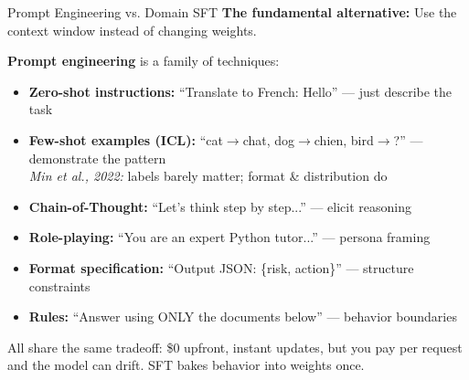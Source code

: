 \documentclass[aspectratio=169]{beamer}
\begin{document}
\begin{frame}{Prompt Engineering vs. Domain SFT}
  \small
  \textbf{The fundamental alternative:} Use the context window instead of changing weights.

  \vspace{4pt}
  \begin{noteframe}
  \textbf{Prompt engineering} is a family of techniques:
  \vspace{2pt}
  \begin{itemize}
    \item \textbf{Zero-shot instructions:} ``Translate to French: Hello'' --- just describe the task
    \item \textbf{Few-shot examples (ICL):} ``cat$\rightarrow$chat, dog$\rightarrow$chien, bird$\rightarrow$?'' --- demonstrate the pattern\\
    {\scriptsize\color{NoteGray} \textit{Min et al., 2022:} labels barely matter; format \& distribution do}
    \item \textbf{Chain-of-Thought:} ``Let's think step by step...'' --- elicit reasoning
    \item \textbf{Role-playing:} ``You are an expert Python tutor...'' --- persona framing
    \item \textbf{Format specification:} ``Output JSON: \{risk, action\}'' --- structure constraints
    \item \textbf{Rules:} ``Answer using ONLY the documents below'' --- behavior boundaries
  \end{itemize}
  \end{noteframe}

  \vspace{4pt}
  {\footnotesize\color{NoteGray} All share the same tradeoff: \$0 upfront, instant updates, but you pay per request and the model can drift. SFT bakes behavior into weights once.}
\end{frame}
\end{document}
